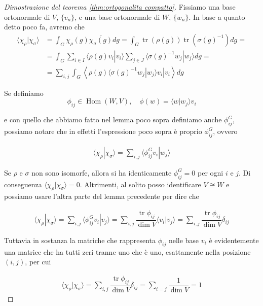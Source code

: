 \documentclass[11pt]{article}
\theoremstyle{plain}
\theoremstyle{definition}
\theoremstyle{remark}
\newcommand{\dsum}{\displaystyle\sum}
\newcommand{\dint}{\displaystyle\int}
\DeclareMathOperator{\tr}{tr}
\DeclareMathOperator{\Hom}{Hom}
\begin{document}
 \begin{proof}[Dimostrazione del teorema \ref{thm:ortogonalita compatto}]
 Fissiamo una base ortonormale di $V$, $\{v_n\}$, e una base ortonormale di $W$, $\{w_n\}$. In base a quanto detto poco fa, avremo che
 \begin{align*}
   \langle \chi_\rho | \chi_\sigma \rangle &= \dint_G \chi_\rho(g) \overline{\chi_\sigma(g)} dg = \dint_G \tr(\rho(g)) \tr(\sigma(g)^{-1}) dg = \\
   &= \dint_G \dsum_{i \in I} \langle \rho(g) v_i | v_i \rangle \dsum_{j \in J} \langle \sigma(g)^{-1} w_j | w_j \rangle dg = \\
   &= \dsum_{i,j} \dint_G \left\langle \rho(g) \langle \sigma(g)^{-1} w_j | w_j \rangle v_i | v_i \right\rangle dg
 \end{align*}

 Se definiamo
 \[ \phi_{ij} \in \Hom(W, V), \quad \phi(w) = \langle w | w_j \rangle v_i \]

 e con quello che abbiamo fatto nel lemma poco sopra definiamo anche $\phi^G_{ij}$, possiamo notare che in effetti l'espressione poco sopra è proprio $\phi^G_{ij}$, ovvero

 \begin{align*}
   \langle \chi_\rho | \chi_\sigma \rangle = \dsum_{i,j} \langle \phi_{ij}^G v_i | w_j \rangle
 \end{align*}

 Se $\rho$ e $\sigma$ non sono isomorfe, allora si ha identicamente $\phi_{ij}^G = 0$ per ogni $i$ e $j$. Di conseguenza $\langle \chi_\rho | \chi_\sigma \rangle = 0$. Altrimenti, al solito posso identificare $V \cong W$ e possiamo usare l'altra parte del lemma precedente per dire che

\begin{align*}
   \langle \chi_\rho | \chi_\sigma \rangle = \dsum_{i,j} \langle \phi_{ij}^G v_i | v_j \rangle = \dsum_{i,j} \dfrac{\tr \phi_{ij}}{\dim V} \langle v_i | v_j \rangle = \dsum_{i,j } \dfrac{\tr\phi_{ij}}{\dim V} \delta_{ij}
 \end{align*}

Tuttavia in sostanza la matriche che rappresenta $\phi_{ij}$ nelle base $v_i$ è evidentemente una matrice che ha tutti zeri tranne uno che è uno, esattamente nella posizione $(i,j)$, per cui


\begin{align*}
   \langle \chi_\rho | \chi_\sigma \rangle = \dsum_{i,j } \dfrac{\tr\phi_{ij}}{\dim V} \delta_{ij} = \dsum_{i=j} \dfrac{1}{\dim V} = 1
 \end{align*}

 \end{proof}
\end{document}
